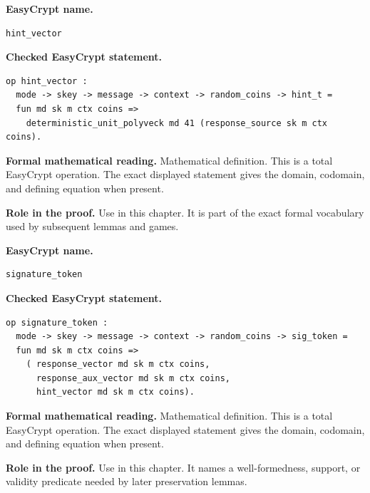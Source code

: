 \begin{formaldefinition}
\noindent\textbf{EasyCrypt name.}
\begin{lstlisting}[language=EasyCrypt,basicstyle=\ttfamily\scriptsize]
hint_vector
\end{lstlisting}
\noindent\textbf{Checked EasyCrypt statement.}
\begin{lstlisting}[language=EasyCrypt,basicstyle=\ttfamily\scriptsize]
op hint_vector :
  mode -> skey -> message -> context -> random_coins -> hint_t =
  fun md sk m ctx coins =>
    deterministic_unit_polyveck md 41 (response_source sk m ctx coins).
\end{lstlisting}
\noindent\textbf{Formal mathematical reading.}
Mathematical definition. This is a total EasyCrypt operation.  The exact displayed statement gives the domain, codomain, and defining equation when present.

\noindent\textbf{Role in the proof.}
Use in this chapter. It is part of the exact formal vocabulary used by subsequent lemmas and games.

\end{formaldefinition}

\begin{formaldefinition}
\noindent\textbf{EasyCrypt name.}
\begin{lstlisting}[language=EasyCrypt,basicstyle=\ttfamily\scriptsize]
signature_token
\end{lstlisting}
\noindent\textbf{Checked EasyCrypt statement.}
\begin{lstlisting}[language=EasyCrypt,basicstyle=\ttfamily\scriptsize]
op signature_token :
  mode -> skey -> message -> context -> random_coins -> sig_token =
  fun md sk m ctx coins =>
    ( response_vector md sk m ctx coins,
      response_aux_vector md sk m ctx coins,
      hint_vector md sk m ctx coins).
\end{lstlisting}
\noindent\textbf{Formal mathematical reading.}
Mathematical definition. This is a total EasyCrypt operation.  The exact displayed statement gives the domain, codomain, and defining equation when present.

\noindent\textbf{Role in the proof.}
Use in this chapter. It names a well-formedness, support, or validity predicate needed by later preservation lemmas.

\end{formaldefinition}

